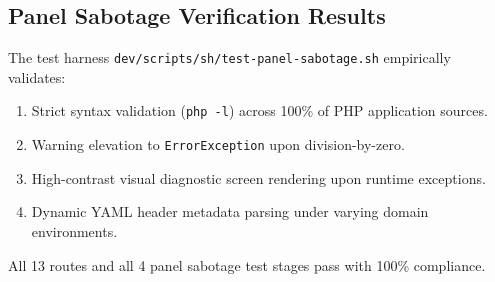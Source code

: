 \subsection{Panel Sabotage Verification Results}
The test harness \texttt{dev/scripts/sh/test-panel-sabotage.sh} empirically validates:
\begin{enumerate}
    \item Strict syntax validation (\texttt{php -l}) across 100\% of PHP application sources.
    \item Warning elevation to \texttt{ErrorException} upon division-by-zero.
    \item High-contrast visual diagnostic screen rendering upon runtime exceptions.
    \item Dynamic YAML header metadata parsing under varying domain environments.
\end{enumerate}

All 13 routes and all 4 panel sabotage test stages pass with 100\% compliance.
